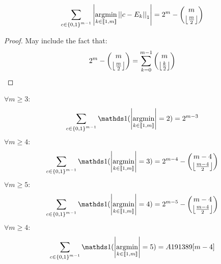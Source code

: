 \begin{lemma}
    \[ \sum_{c \in \left\{ 0, 1 \right\}^{m - 1}} \left|\operatorname*{argmin}_{k \in \left\llbracket1, m\right\rrbracket} \left|\left|c - E_k\right|\right|_1\right| = 2^{m} - \binom{m}{\left\lfloor \frac{m}{2} \right\rfloor} \]
\end{lemma}
\begin{proof}
    May include the fact that:
    \[2^{m} - \binom{m}{\left\lfloor \frac{m}{2} \right\rfloor} = \sum_{k=0}^{m-1} \binom{m}{\left\lfloor \frac{k}{2} \right\rfloor}\]
\end{proof}


\begin{lemma}
    $\forall m \geq 3$:
    \[  \sum_{c \in \set{0, 1}^{m - 1}} \indic{}(\card{\argmin_{k \in \bbrack{1, m}}} = 2) = 2^{m-3} \]
    $\forall m \geq 4$:
    \[  \sum_{c \in \set{0, 1}^{m - 1}} \indic{}(\card{\argmin_{k \in \bbrack{1, m}}} = 3) =  2^{m - 4} - \binom{m - 4}{\floor{\frac{m - 4}{2}}}\]
    $\forall m \geq 5$:
    \[  \sum_{c \in \set{0, 1}^{m - 1}} \indic{}(\card{\argmin_{k \in \bbrack{1, m}}} = 4) =  2^{m - 5} - \binom{m - 4}{\floor{\frac{m - 4}{2}}}\]
    $\forall m \geq 4$:
    \[  \sum_{c \in \set{0, 1}^{m - 1}} \indic{}(\card{\argmin_{k \in \bbrack{1, m}}} = 5) = A191389[m - 4] \]

\end{lemma}